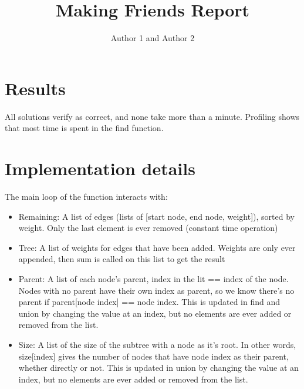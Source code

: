 \documentclass{article}
\title{Making Friends Report}
\author{Author 1 and Author 2}
\begin{document}
  \maketitle

  \section{Results}

  All solutions verify as correct, and none take more than a minute. Profiling shows that most time is spent in the find function.
  
  \section{Implementation details}
  
  The main loop of the function interacts with:
  \begin{itemize}
  	\item Remaining: A list of edges (lists of [start node, end node, weight]), sorted by weight. Only the last element is ever removed (constant time operation)
  	\item Tree: A list of weights for edges that have been added. Weights are only ever appended, then sum is called on this list to get the result
    \item Parent: A list of each node's parent, index in the lit == index of the node. Nodes with no parent have their own index as parent, so we know there's no parent if parent[node index] == node index. This is updated in find and union by changing the value at an index, but no elements are ever added or removed from the list.
    \item Size: A list of the size of the subtree with a node as it's root. In other words, size[index] gives the number of nodes that have node index as their parent, whether directly or not. This is updated in union by changing the value at an index, but no elements are ever added or removed from the list.
  \end{itemize}

  
\end{document}
